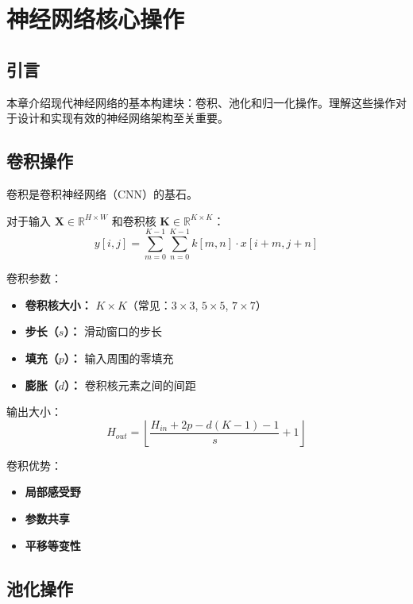 %

\clearpage
\cleardoublepage

\chapter{神经网络核心操作}

\section{引言}

本章介绍现代神经网络的基本构建块：卷积、池化和归一化操作。理解这些操作对于设计和实现有效的神经网络架构至关重要。

\section{卷积操作}

卷积是卷积神经网络（CNN）的基石。

对于输入 $\mathbf{X} \in \mathbb{R}^{H \times W}$ 和卷积核 $\mathbf{K} \in \mathbb{R}^{K \times K}$：
\begin{equation}
y[i,j] = \sum_{m=0}^{K-1}\sum_{n=0}^{K-1} k[m,n] \cdot x[i+m, j+n]
\end{equation}

卷积参数：
\begin{itemize}
    \item \textbf{卷积核大小：} $K \times K$（常见：$3\times3$, $5\times5$, $7\times7$）
    \item \textbf{步长（$s$）：} 滑动窗口的步长
    \item \textbf{填充（$p$）：} 输入周围的零填充
    \item \textbf{膨胀（$d$）：} 卷积核元素之间的间距
\end{itemize}

输出大小：
\begin{equation}
H_{out} = \left\lfloor \frac{H_{in} + 2p - d(K-1) - 1}{s} + 1 \right\rfloor
\end{equation}

卷积优势：
\begin{itemize}
    \item \textbf{局部感受野}
    \item \textbf{参数共享}
    \item \textbf{平移等变性}
\end{itemize}

\section{池化操作}

